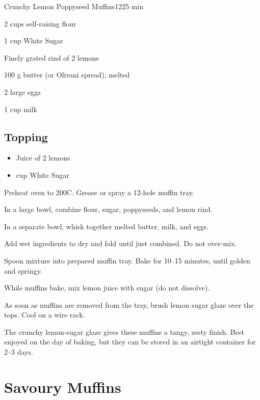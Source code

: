 \begin{recipebox}{Crunchy Lemon Poppyseed Muffins}{12}{25 min}
\begin{ingredients}
  \item 2 cups self-raising flour
  \item 1 cup White Sugar
  \item Finely grated rind of 2 lemons
  \item 100 g butter (or Olivani spread), melted
  \item 2 large eggs
  \item 1 cup milk
\end{ingredients}

\subsection*{Topping}
\begin{itemize}[leftmargin=2em]
  \item Juice of 2 lemons
  \item {} cup White Sugar
\end{itemize}

\begin{method}
  \item Preheat oven to 200\degree C. Grease or spray a 12-hole muffin tray.
  \item In a large bowl, combine flour, sugar, poppyseeds, and lemon rind.
  \item In a separate bowl, whisk together melted butter, milk, and eggs.
  \item Add wet ingredients to dry and fold until just combined. Do not over-mix.
  \item Spoon mixture into prepared muffin tray. Bake for 10–15 minutes, until golden and springy.
  \item While muffins bake, mix lemon juice with sugar (do not dissolve).
  \item As soon as muffins are removed from the tray, brush lemon sugar glaze over the tops. Cool on a wire rack.
\end{method}

\begin{notes}
The crunchy lemon-sugar glaze gives these muffins a tangy, zesty finish.  
Best enjoyed on the day of baking, but they can be stored in an airtight container for 2–3 days.  
\end{notes}
\end{recipebox}

\section*{Savoury Muffins}

